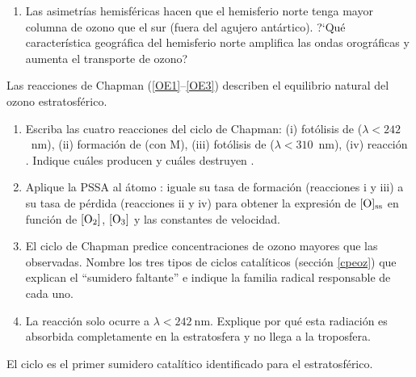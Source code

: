 \begin{bloque_ejercicios}
\begin{ejercicios}
\begin{enumerate}[label=\alph*)]
    \item Las asimetr\'ias hemisf\'ericas hacen que
          el hemisferio norte tenga mayor columna de ozono
          que el sur (fuera del agujero ant\'artico).
          ?`Qu\'e caracter\'istica geogr\'afica del
          hemisferio norte amplifica las ondas
          orogr\'aficas y aumenta el transporte de ozono?
\end{enumerate}

\item Las reacciones de Chapman (\ref{OE1}--\ref{OE3})
describen el equilibrio natural del ozono estratosf\'erico.

\begin{enumerate}[label=\alph*)]
    \item Escriba las cuatro reacciones del ciclo de Chapman:
          (i) fot\'olisis de  ($\lambda<242$~nm),
          (ii) formaci\'on de  (con M),
          (iii) fot\'olisis de  ($\lambda<310$~nm),
          (iv) reacci\'on .
          Indique cu\'ales producen y cu\'ales destruyen .

    \item Aplique la PSSA al \'atomo :
          iguale su tasa de formaci\'on (reacciones i y iii)
          a su tasa de p\'erdida (reacciones ii y iv)
          para obtener la expresi\'on de $[\ce{O}]_\mathrm{ss}$
          en funci\'on de $[\ce{O2}]$, $[\ce{O3}]$ y las
          constantes de velocidad.

    \item El ciclo de Chapman predice concentraciones de
          ozono mayores que las observadas.
          Nombre los tres tipos de ciclos catal\'iticos
          (secci\'on \ref{cpeoz}) que explican el ``sumidero
          faltante'' e indique la familia radical
          responsable de cada uno.

    \item La reacci\'on  solo ocurre
          a $\lambda < \SI{242}{\nano\metre}$.
          Explique por qu\'e esta radiaci\'on es absorbida
          completamente en la estratosfera y no llega
          a la troposfera.
\end{enumerate}

\item El ciclo  es el primer sumidero catal\'itico
identificado para el  estratosf\'erico.


\end{ejercicios}
\end{bloque_ejercicios}
